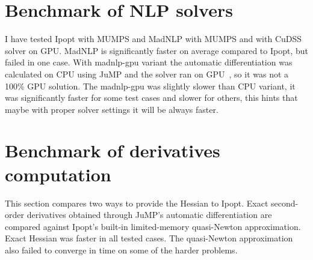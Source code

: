 \section{Benchmark of NLP solvers}
I have tested Ipopt with MUMPS and MadNLP with MUMPS and with CuDSS solver on GPU. MadNLP is significantly faster on average compared to Ipopt, but failed in one case. With madnlp-gpu variant the automatic differentiation was calculated on CPU using JuMP and the solver ran on GPU~\cite{madnlp_gpu_tutorial}, so it was not a 100\% GPU solution. The madnlp-gpu was slightly slower than CPU variant, it was significantly faster for some test cases and slower for others, this hints that maybe with proper solver settings it will be always faster.

\label{tab:backend-summary}


\label{tab:backend-results}


\section{Benchmark of derivatives computation}
This section compares two ways to provide the Hessian to Ipopt. Exact second-order derivatives obtained through JuMP's automatic differentiation are compared against Ipopt's built-in limited-memory quasi-Newton approximation. Exact Hessian was faster in all tested cases. The quasi-Newton approximation also failed to converge in time on some of the harder problems.

\label{tab:hessian-summary}


\label{tab:hessian-results}



